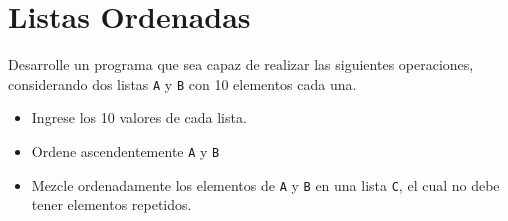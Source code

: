 \section{Listas Ordenadas}

Desarrolle un programa que sea capaz de realizar las siguientes
operaciones, considerando dos listas \lstinline!A! y \lstinline!B! con
10 elementos cada una.

\begin{itemize}
\item
  Ingrese los 10 valores de cada lista.
\item
  Ordene ascendentemente \lstinline!A! y \lstinline!B!
\item
  Mezcle ordenadamente los elementos de \lstinline!A! y \lstinline!B! en
  una lista \lstinline!C!, el cual no debe tener elementos repetidos.
\end{itemize}
